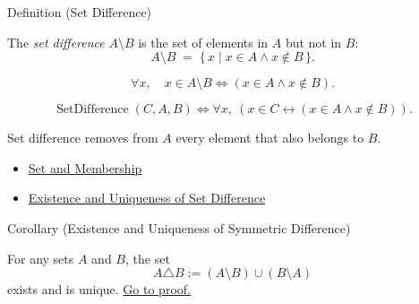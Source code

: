 \begin{definitionbox}{Definition (Set Difference)}
\begin{definition}\label{def:set-difference}
The \emph{set difference} $A \setminus B$ is the set of elements in $A$ but
not in $B$:
\[
A \setminus B \;=\; \{\, x \mid x \in A \land x \notin B \,\}.
\]
\end{definition}
\end{definitionbox}

\begin{remark*}
\[
  \forall x,\quad x\in A\setminus B \iff (x\in A\wedge x\notin B).
\]
\end{remark*}

\begin{remark*}
\[
  \operatorname{SetDifference}(C,A,B)
  \iff
  \forall x,\ (x\in C \leftrightarrow (x\in A\wedge x\notin B)).
\]
\end{remark*}

\begin{remark*}[Interpretation]
Set difference removes from $A$ every element that also belongs to $B$.
\end{remark*}

\begin{dependencies}
\begin{itemize}
  \item \hyperref[def:set-membership]{Set and Membership}
  \item \hyperref[cor:set-difference-exists-unique]{Existence and Uniqueness of Set Difference}
\end{itemize}
\end{dependencies}



\begin{corollarybox}{Corollary (Existence and Uniqueness of Symmetric Difference)}
\begin{corollary}\label{cor:symmetric-difference-exists-unique}
For any sets $A$ and $B$, the set
\[
  A\triangle B:=(A\setminus B)\cup(B\setminus A)
\]
exists and is unique.
\hyperref[prf:symmetric-difference-exists-unique]{Go to proof.}
\end{corollary}
\end{corollarybox}



